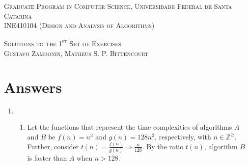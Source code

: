 \documentclass[12pt]{article}
\newcommand{\intwzero}{\mathbb{Z}^{\geq}}
\begin{document}
\textsc{Graduate Program in Computer Science,
  Universidade Federal de Santa Catarina} \\
\textsc{INE410104 (Design and Analysis of Algorithms)}

\textsc{Solutions to the 1\textsuperscript{st} Set of Exercises} \\
\textsc{Gustavo Zambonin, Matheus S. P. Bittencourt}

\section{Answers}

\begin{enumerate}
  \item
  \begin{enumerate}
    \item Let the functions that represent the time complexities of algorithms $A$ and $B$ be $f(n) = n^{3}$ and $g(n) = 128n^{2}$, respectively, with $n \in \intwzero$. Further, consider $t(n) = \frac{f(n)}{g(n)} \Rightarrow \frac{n}{128}$. By the ratio $t(n)$, algorithm $B$ is faster than $A$ when $n > 128$.
    

\end{enumerate}
\end{enumerate}
\end{document}
